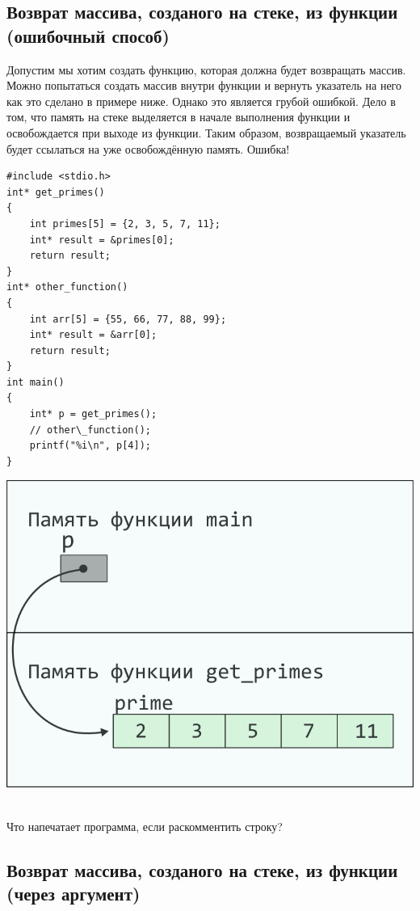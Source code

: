\documentclass[10pt]{article}
\begin{document}
\subsection*{Возврат массива, созданого на стеке, из функции (ошибочный способ)}
Допустим мы хотим создать функцию, которая должна будет возвращать массив.
Можно попытаться создать массив внутри функции и вернуть указатель на него как
это сделано в примере ниже.
Однако это является грубой ошибкой. Дело в том, что память на стеке
выделяется в начале выполнения функции и освобождается при выходе из функции.
Таким образом, возвращаемый указатель будет ссылаться на уже освобождённую память. Ошибка!
\noindent\begin{minipage}{.45\textwidth}
\begin{lstlisting}
#include <stdio.h>
int* get_primes() 
{
    int primes[5] = {2, 3, 5, 7, 11};
    int* result = &primes[0];
    return result;
}
int* other_function() 
{
    int arr[5] = {55, 66, 77, 88, 99};
    int* result = &arr[0];
    return result;
}
int main() 
{
    int* p = get_primes();
    // other\_function();
    printf("%i\n", p[4]);
}
\end{lstlisting}
\end{minipage}
\begin{minipage}{.45\textwidth}
\includegraphics[scale=0.9]{../images/pointer_schemes/function_return_stack_array.png}
\end{minipage}\\
Что напечатает программа, если раскомментить строку?

\subsection*{Возврат массива, созданого на стеке, из функции (через аргумент)}
\end{document}
